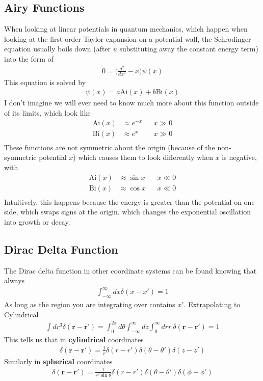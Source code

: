 \subsection{Airy Functions}
When looking at linear potentials in quantum mechanics, which happen when looking at the first order Taylor expansion on a potential wall, the Schrodinger equation usually boils down (after $u$ substituting away the constant energy term) into the form of
\begin{align}
0 = \Big(\frac{d^2}{dx^2} - x\Big) \psi(x)
\end{align}
This equation is solved by
\begin{align}
\psi(x) = a\textrm{Ai}(x) + b\textrm{Bi}(x)
\end{align}
I don't imagine we will ever need to know much more about this function outside of its limits, which look like
\begin{align}
\textrm{Ai}(x) &\approx e^{-x} && x\gg 0\\
\textrm{Bi}(x) &\approx e^{x} && x\gg 0\\
\end{align}
These functions are not symmetric about the origin (because of the non-symmetric potential $x$) which causes them to look differently when $x$ is negative, with
\begin{align}
\textrm{Ai}(x) &\approx \sin x && x\ll 0\\
\textrm{Bi}(x) &\approx \cos x && x\ll 0\\
\end{align}
Intuitively, this happens because the energy is greater than the potential on one side, which swaps signs at the origin. which changes the exponential oscillation into growth or decay.

\subsection{Dirac Delta Function}
The Dirac delta function in other coordinate systems can be found knowing that always
\begin{align}
\int_{-\infty}^\infty dx \delta(x-x') = 1
\end{align}
As long as the region you are integrating over contains $x'$. Extrapolating to Cylindrical
\begin{align}
\int dr^3 \delta(\textbf{r}-\textbf{r}') = \int_0^{2\pi} d\theta \int_{-\infty}^\infty dz \int_0^\infty dr r ~\delta(\textbf{r}-\textbf{r}') = 1
\end{align}
This tells us that in \textbf{cylindrical} coordinates
\begin{align}
\delta(\textbf{r}-\textbf{r}') = \frac{1}{r}\delta(r-r')\delta(\theta-\theta')\delta(z-z')
\end{align}
Similarly in \textbf{spherical} coordinates
\begin{align}
\delta(\textbf{r}-\textbf{r}') = \frac{1}{r^2\sin\theta}\delta(r-r')\delta(\theta-\theta')\delta(\phi-\phi')
\end{align}





